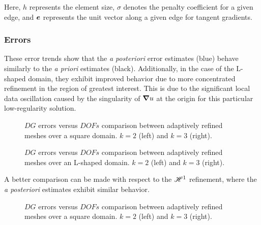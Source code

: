 Here, $h$ represents the element size, $\sigma$ denotes the penalty coefficient for a given edge, and $\bm{e}$ represents the unit vector along a given edge for tangent gradients.

\newpage
\subsubsection{Errors}

These error trends show that the \textit{a posteriori} error estimates (blue) behave similarly to the \textit{a priori} estimates (black). Additionally, in the case of the L-shaped domain, they exhibit improved behavior due to more concentrated refinement in the region of greatest interest. This is due to the significant local data oscillation caused by the singularity of $\bm{\nabla} u$ at the origin for this particular low-regularity solution.

\begin{figure}[!ht]
	\begin{subfigure}[b]{0.45\textwidth}
		
	\end{subfigure}
	\hfill
	\begin{subfigure}[b]{0.45\textwidth}
		
	\end{subfigure}
    \caption{$DG$ errors versus $DOFs$ comparison between adaptively refined meshes over a square domain. $k = 2$ (left) and $k = 3$ (right).}
\end{figure}

\begin{figure}[!ht]
	\begin{subfigure}[b]{0.45\textwidth}
		
	\end{subfigure}
	\hfill
	\begin{subfigure}[b]{0.45\textwidth}
	\end{subfigure}
    \caption{$DG$ errors versus $DOFs$ comparison between adaptively refined meshes over an L-shaped domain. $k = 2$ (left) and $k = 3$ (right).}
\end{figure}

\newpage

A better comparison can be made with respect to the $\mathscr{H}^1$ refinement, where the \textit{a posteriori} estimates exhibit similar behavior.

\begin{figure}[!ht]
	\begin{subfigure}[b]{0.45\textwidth}
		
	\end{subfigure}
	\hfill
	\begin{subfigure}[b]{0.45\textwidth}
		
	\end{subfigure}
    \caption{$DG$ errors versus $DOFs$ comparison between adaptively refined meshes over a square domain. $k = 2$ (left) and $k = 3$ (right).}
\end{figure}

